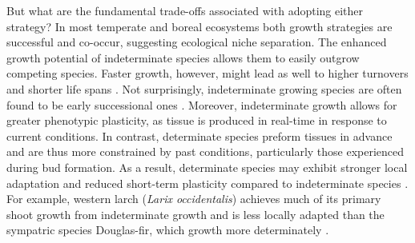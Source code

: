 \documentclass{article}
\begin{document}
	But what are the fundamental trade-offs associated with adopting either strategy? In most temperate and boreal ecosystems both growth strategies are successful and co-occur, suggesting ecological niche separation. The enhanced growth potential of indeterminate species allows them to easily outgrow competing species. Faster growth, however, might lead as well to higher turnovers and shorter life spans \citep{brienenForestCarbonSink2020b, milletRelationshipArchitectureSuccessional1999}. Not surprisingly, indeterminate growing species are often found to be early successional ones \citep{marksRelationExtensionGrowth1975, boojhGrowthStrategyTrees1982}.
Moreover, indeterminate growth allows for greater phenotypic plasticity, as tissue is produced in real-time in response to current conditions. In contrast, determinate species preform tissues in advance and are thus more constrained by past conditions, particularly those experienced during bud formation. As a result, determinate species may exhibit stronger local adaptation and reduced short-term plasticity compared to indeterminate species  \citep{leitesForestTreeSpecies2023}. For example, western larch (\textit{Larix occidentalis}) achieves much of its primary shoot growth from indeterminate growth %
	and is less locally adapted than the sympatric species Douglas-fir, which growth more determinately \citep{roskillyWeakLocalAdaptation2024}.\\

\end{document}
